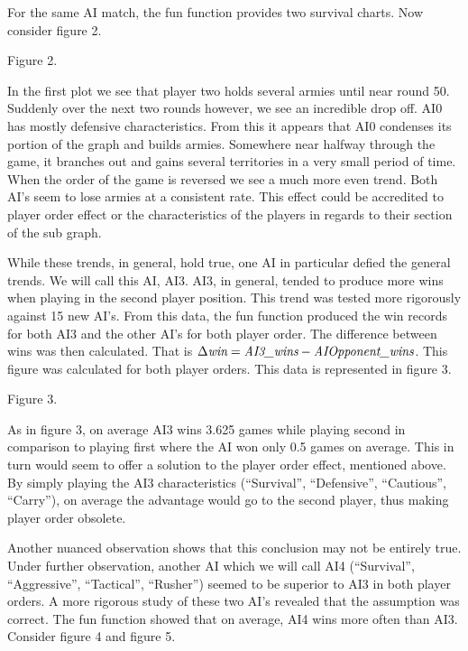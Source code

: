 \documentclass[12pt]{article}  %
\begin{document}
For the same AI match, the fun function provides two survival charts. Now consider figure 2. 


\begin{center}
{\footnotesize Figure 2.}
\end{center}

In the first plot we see that player two holds several armies until near round 50. Suddenly over the next two rounds however, we see an incredible drop off. AI0 has mostly defensive characteristics. From this it appears that AI0 condenses its portion of the graph and builds armies. Somewhere near halfway through the game, it branches out and gains several territories in a very small period of time. When the order of the game is reversed we see a much more even trend. Both AI’s seem to lose armies at a consistent rate. This effect could be accredited to player order effect or the characteristics of the players in regards to their section of the sub graph. 


While these trends, in general, hold true, one AI in particular defied the general trends. We will call this AI, AI3. AI3, in general, tended to produce more wins when playing in the second player position. This trend was tested more rigorously against 15 new AI’s. From this data, the fun function produced the win records for both AI3 and the other AI’s for both player order. The difference between wins was then calculated. That is $\Delta \emph{win} = \emph{AI3\_wins} - \emph{AIOpponent\_wins}$. This figure was calculated for both player orders. This data is represented in figure 3.



\begin{center}
{\footnotesize Figure 3.}
\end{center}


As in figure 3, on average AI3 wins 3.625 games while playing second in comparison to playing first where the AI won only 0.5 games on average. This in turn would seem to offer a solution to the player order effect, mentioned above. By simply playing the AI3 characteristics (“Survival”, “Defensive”, “Cautious”, “Carry”), on average the advantage would go to the second player, thus making player order obsolete. 


Another nuanced observation shows that this conclusion may not be entirely true. Under further observation, another AI which we will call AI4 (“Survival”, “Aggressive”, “Tactical”, “Rusher”) seemed to be superior to AI3 in both player orders. A more rigorous study of these two AI’s revealed that the assumption was correct. The fun function showed that on average, AI4 wins more often than AI3. Consider figure 4 and figure 5. 
\end{document}
